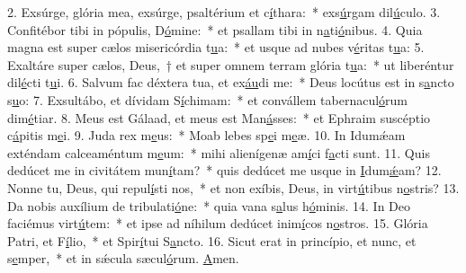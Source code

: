 2. Exsúrge, glória mea, exsúrge, psaltérium et c\uline{í}thara:~* exs\uline{ú}rgam dil\uline{ú}culo.
3. Confitébor tibi in pópulis, D\uline{ó}mine:~* et psallam tibi in n\uline{a}ti\uline{ó}nibus.
4. Quia magna est super cælos misericórdia t\uline{u}a:~* et usque ad nubes v\uline{é}ritas t\uline{u}a:
5. Exaltáre super cælos, Deus,~† et super omnem terram glória t\uline{u}a:~* ut liberéntur dil\uline{é}cti t\uline{u}i.
6. Salvum fac déxtera tua, et ex\uline{áu}di me:~* Deus locútus est in s\uline{a}ncto s\uline{u}o:
7. Exsultábo, et dívidam S\uline{í}chimam:~* et convállem tabernacul\uline{ó}rum dim\uline{é}tiar.
8. Meus est Gálaad, et meus est Man\uline{á}sses:~* et Ephraim suscéptio c\uline{á}pitis m\uline{e}i.
9. Juda rex m\uline{e}us:~* Moab lebes sp\uline{e}i m\uline{e}æ.
10. In Idumǽam exténdam calceaméntum m\uline{e}um:~* mihi alienígenæ am\uline{í}ci f\uline{a}cti sunt.
11. Quis dedúcet me in civitátem mun\uline{í}tam?~* quis dedúcet me usque in \uline{I}dum\uline{ǽ}am?
12. Nonne tu, Deus, qui repul\uline{í}sti nos,~* et non exíbis, Deus, in virt\uline{ú}tibus n\uline{o}stris?
13. Da nobis auxílium de tribulati\uline{ó}ne:~* quia vana s\uline{a}lus h\uline{ó}minis.
14. In Deo faciémus virt\uline{ú}tem:~* et ipse ad níhilum dedúcet inim\uline{í}cos n\uline{o}stros.
15. Glória Patri, et F\uline{í}lio,~* et Spir\uline{í}tui S\uline{a}ncto.
16. Sicut erat in princípio, et nunc, et s\uline{e}mper,~* et in sǽcula sæcul\uline{ó}rum. \uline{A}men.
